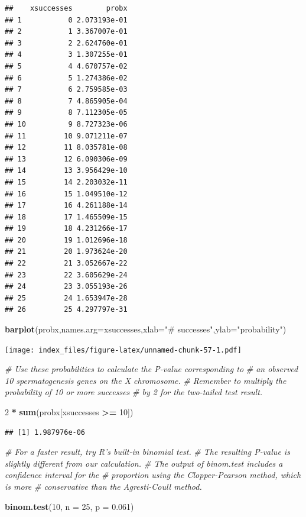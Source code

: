 \documentclass[]{article}
\newenvironment{Shaded}{\begin{snugshade}}{\end{snugshade}}
\newcommand{\CommentTok}[1]{\textcolor[rgb]{0.56,0.35,0.01}{\textit{#1}}}
\newcommand{\DataTypeTok}[1]{\textcolor[rgb]{0.13,0.29,0.53}{#1}}
\newcommand{\DecValTok}[1]{\textcolor[rgb]{0.00,0.00,0.81}{#1}}
\newcommand{\FloatTok}[1]{\textcolor[rgb]{0.00,0.00,0.81}{#1}}
\newcommand{\KeywordTok}[1]{\textcolor[rgb]{0.13,0.29,0.53}{\textbf{#1}}}
\newcommand{\NormalTok}[1]{#1}
\newcommand{\OperatorTok}[1]{\textcolor[rgb]{0.81,0.36,0.00}{\textbf{#1}}}
\newcommand{\StringTok}[1]{\textcolor[rgb]{0.31,0.60,0.02}{#1}}
\begin{document}
\begin{verbatim}
##    xsuccesses        probx
## 1           0 2.073193e-01
## 2           1 3.367007e-01
## 3           2 2.624760e-01
## 4           3 1.307255e-01
## 5           4 4.670757e-02
## 6           5 1.274386e-02
## 7           6 2.759585e-03
## 8           7 4.865905e-04
## 9           8 7.112305e-05
## 10          9 8.727323e-06
## 11         10 9.071211e-07
## 12         11 8.035781e-08
## 13         12 6.090306e-09
## 14         13 3.956429e-10
## 15         14 2.203032e-11
## 16         15 1.049510e-12
## 17         16 4.261188e-14
## 18         17 1.465509e-15
## 19         18 4.231266e-17
## 20         19 1.012696e-18
## 21         20 1.973624e-20
## 22         21 3.052667e-22
## 23         22 3.605629e-24
## 24         23 3.055193e-26
## 25         24 1.653947e-28
## 26         25 4.297797e-31
\end{verbatim}

\begin{Shaded}
\begin{Highlighting}[]
\KeywordTok{barplot}\NormalTok{(probx,}\DataTypeTok{names.arg=}\NormalTok{xsuccesses,}\DataTypeTok{xlab=}\StringTok{"# successes"}\NormalTok{,}\DataTypeTok{ylab=}\StringTok{"probability"}\NormalTok{)}
\end{Highlighting}
\end{Shaded}

\texttt{[image: index\_files/figure-latex/unnamed-chunk-57-1.pdf]}

\begin{Shaded}
\begin{Highlighting}[]
\CommentTok{# Use these probabilities to calculate the P-value corresponding to}
\CommentTok{# an observed 10 spermatogenesis genes on the X chromosome. }
\CommentTok{# Remember to multiply the probability of 10 or more successes }
\CommentTok{# by 2 for the two-tailed test result.}

\DecValTok{2} \OperatorTok{*}\StringTok{ }\KeywordTok{sum}\NormalTok{(probx[xsuccesses }\OperatorTok{>=}\StringTok{ }\DecValTok{10}\NormalTok{])}
\end{Highlighting}
\end{Shaded}

\begin{verbatim}
## [1] 1.987976e-06
\end{verbatim}

\begin{Shaded}
\begin{Highlighting}[]
\CommentTok{# For a faster result, try R's built-in binomial test. }
\CommentTok{# The resulting P-value is slightly different from our calculation. # The output of binom.test includes a confidence interval for the }
\CommentTok{# proportion using the Clopper-Pearson method, which is more }
\CommentTok{# conservative than the Agresti-Coull method.}

\KeywordTok{binom.test}\NormalTok{(}\DecValTok{10}\NormalTok{, }\DataTypeTok{n =} \DecValTok{25}\NormalTok{, }\DataTypeTok{p =} \FloatTok{0.061}\NormalTok{)}
\end{Highlighting}
\end{Shaded}
\end{document}
